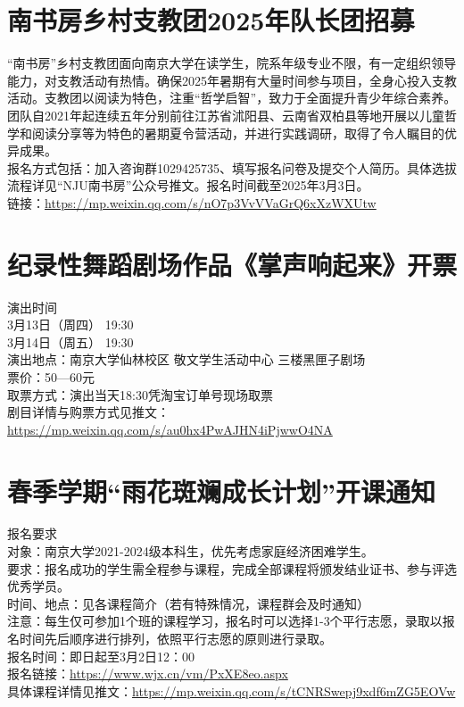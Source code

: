 \documentclass[letterpaper, 12pt]{article}
\begin{document}
\begin{multicols}{2}
\section{南书房乡村支教团2025年队长团招募}
“南书房”乡村支教团面向南京大学在读学生，院系年级专业不限，有一定组织领导能力，对支教活动有热情。确保2025年暑期有大量时间参与项目，全身心投入支教活动。支教团以阅读为特色，注重“哲学启智”，致力于全面提升青少年综合素养。团队自2021年起连续五年分别前往江苏省沭阳县、云南省双柏县等地开展以儿童哲学和阅读分享等为特色的暑期夏令营活动，并进行实践调研，取得了令人瞩目的优异成果。\\
报名方式包括：加入咨询群1029425735、填写报名问卷及提交个人简历。具体选拔流程详见“NJU南书房”公众号推文。报名时间截至2025年3月3日。\\
链接：\url{https://mp.weixin.qq.com/s/nO7p3VvVVaGrQ6xXzWXUtw}\\

\section{纪录性舞蹈剧场作品《掌声响起来》开票}
演出时间\\
3月13日（周四） 19:30\\
3月14日（周五） 19:30\\
演出地点：南京大学仙林校区 敬文学生活动中心 三楼黑匣子剧场\\
票价：50—60元\\
取票方式：演出当天18:30凭淘宝订单号现场取票\\
剧目详情与购票方式见推文：\url{https://mp.weixin.qq.com/s/au0hx4PwAJHN4iPjwwO4NA}

\section{春季学期“雨花斑斓成长计划”开课通知}
报名要求\\
对象：南京大学2021-2024级本科生，优先考虑家庭经济困难学生。\\
要求：报名成功的学生需全程参与课程，完成全部课程将颁发结业证书、参与评选优秀学员。\\
时间、地点：见各课程简介（若有特殊情况，课程群会及时通知）\\
注意：每生仅可参加1个班的课程学习，报名时可以选择1-3个平行志愿，录取以报名时间先后顺序进行排列，依照平行志愿的原则进行录取。\\
报名时间：即日起至3月2日12：00\\
报名链接：\url{https://www.wjx.cn/vm/PxXE8eo.aspx}\\
具体课程详情见推文：\url{https://mp.weixin.qq.com/s/tCNRSwepj9xdf6mZG5EOVw}

\end{multicols} 
\end{document}
